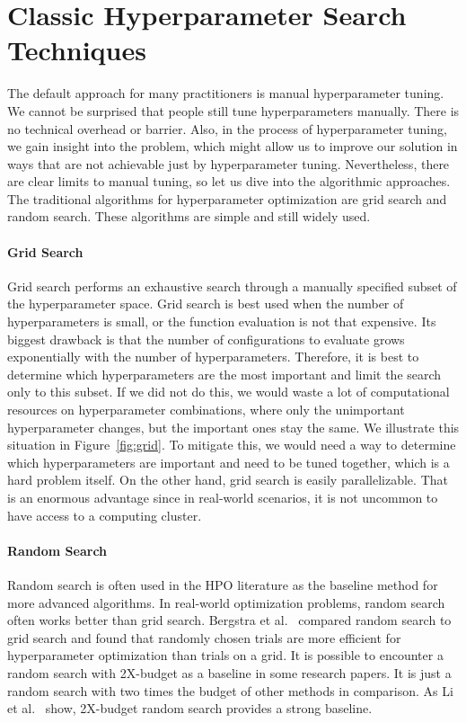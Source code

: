 \section{Classic Hyperparameter Search Techniques}
The default approach for many practitioners is manual hyperparameter tuning. We cannot be surprised that people still tune hyperparameters manually. There is no technical overhead or barrier. Also, in the process of hyperparameter tuning, we gain insight into the problem, which might allow us to improve our solution in ways that are not achievable just by hyperparameter tuning. Nevertheless, there are clear limits to manual tuning, so let us dive into the algorithmic approaches. The traditional algorithms for hyperparameter optimization are grid search and random search. These algorithms are simple and still widely used.

\paragraph{Grid Search} Grid search performs an exhaustive search through a manually specified subset of the hyperparameter space. Grid search is best used when the number of hyperparameters is small, or the function evaluation is not that expensive. Its biggest drawback is that the number of configurations to evaluate grows exponentially with the number of hyperparameters. Therefore, it is best to determine which hyperparameters are the most important and limit the search only to this subset. If we did not do this, we would waste a lot of computational resources on hyperparameter combinations, where only the unimportant hyperparameter changes, but the important ones stay the same. We illustrate this situation in Figure~\ref{fig:grid}. To mitigate this, we would need a way to determine which hyperparameters are important and need to be tuned together, which is a hard problem itself. On the other hand, grid search is easily parallelizable. That is an enormous advantage since in real-world scenarios, it is not uncommon to have access to a computing cluster.

\paragraph{Random Search} Random search is often used in the HPO literature as the baseline method for more advanced algorithms. In real-world optimization problems, random search often works better than grid search. Bergstra et al.~\cite{bergstra2012random} compared random search to grid search and found that randomly chosen trials are more efficient for hyperparameter optimization than trials on a grid. It is possible to encounter a random search with 2X-budget as a baseline in some research papers. It is just a random search with two times the budget of other methods in comparison. As Li et al.~\cite{li2018hyperband} show, 2X-budget random search provides a strong baseline.

